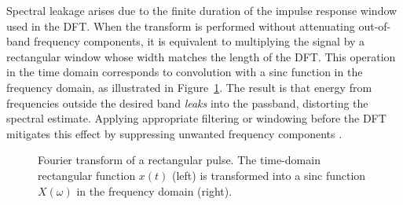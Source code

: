 Spectral leakage arises due to the finite duration of the impulse response window used in the DFT. When the transform is performed without attenuating out-of-band frequency components, it is equivalent to multiplying the signal by a rectangular window whose width matches the length of the DFT. This operation in the time domain corresponds to convolution with a sinc function in the frequency domain, as illustrated in Figure~\ref{fig:rectangular_fourier}. The result is that energy from frequencies outside the desired band \emph{leaks} into the passband, distorting the spectral estimate. Applying appropriate filtering or windowing before the DFT mitigates this effect by suppressing unwanted frequency components \citep{Price2016spectrometers}.
\begin{figure}[h!]
	\centering
	\caption[Fourier transform of a rectangular pulse]{Fourier transform of a rectangular pulse. The time-domain rectangular function $x(t)$ (left) is transformed into a sinc function $X(\omega)$ in the frequency domain (right).}
	\label{fig:rectangular_fourier}
\end{figure}

